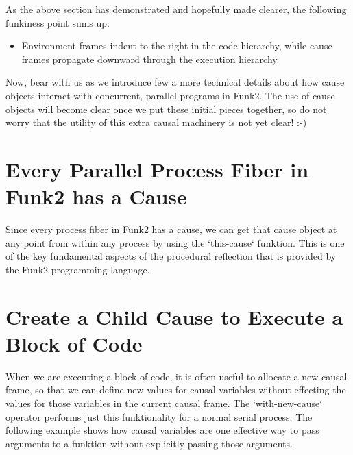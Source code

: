 As the above section has demonstrated and hopefully made clearer, the
following funkiness point sums up:

\begin{itemize}
\item Environment frames indent to the right in the code hierarchy, while cause frames propagate downward through the execution hierarchy.
\end{itemize}

Now, bear with us as we introduce few a more technical details about
how cause objects interact with concurrent, parallel programs in
Funk2.  The use of cause objects will become clear once we put these
initial pieces together, so do not worry that the utility of this
extra causal machinery is not yet clear!  :-)

\section{Every Parallel Process Fiber in Funk2 has a Cause}

Since every process fiber in Funk2 has a cause, we can get that cause
object at any point from within any process by using the `this-cause`
funktion.  This is one of the key fundamental aspects of the
procedural reflection that is provided by the Funk2 programming
language.

%

\section{Create a Child Cause to Execute a Block of Code}

When we are executing a block of code, it is often useful to allocate
a new causal frame, so that we can define new values for causal
variables without effecting the values for those variables in the
current causal frame.  The `with-new-cause` operator performs just
this funktionality for a normal serial process.  The following example
shows how causal variables are one effective way to pass arguments to
a funktion without explicitly passing those arguments.

%
%
%
%
%
%

